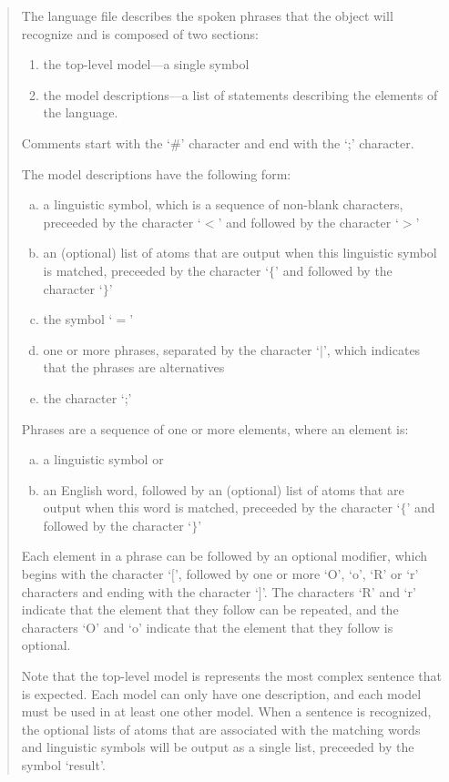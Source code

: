 \begin{quote}
The language file describes the spoken phrases that the  object will recognize and is
composed of two sections:
\begin{enumerate}[1)]
\item the top-level model---a single symbol
\item the model descriptions---a list of statements describing the elements of the language.
\end{enumerate}

Comments start with the `\#' character and end with the `;' character.

The model descriptions have the following form:
\begin{enumerate}[a)]
\item a linguistic symbol, which is a sequence of non-blank characters, preceeded by the character `$<$' and
followed by the character `$>$'
\item an (optional) list of atoms that are output when this linguistic symbol is matched, preceeded by the
character `$\{$' and followed by the character `$\}$'
\item the symbol `$=$'
\item one or more phrases, separated by the character `$\mid$', which indicates that the phrases are
alternatives
\item the character `;'
\end{enumerate}

Phrases are a sequence of one or more elements, where an element is:
\begin{enumerate}[a)]
\item a linguistic symbol or
\item an English word, followed by an (optional) list of atoms that are output when this word is matched,
preceeded by the character `$\{$' and followed by the character `$\}$'
\end{enumerate}
Each element in a phrase can be followed by an optional modifier, which begins with the character `$[$',
followed by one or more `O', `o', `R' or `r' characters and ending with the character `$]$'.
The characters `R' and `r' indicate that the element that they follow can be repeated, and the characters
`O' and `o' indicate that the element that they follow is optional.

Note that the top-level model is represents the most complex sentence that is expected.
Each model can only have one description, and each model must be used in at least one other model.
When a sentence is recognized, the optional lists of atoms that are associated with the matching
words and linguistic symbols will be output as a single list, preceeded by the symbol `result'.
\end{quote}

